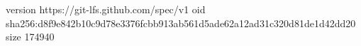 version https://git-lfs.github.com/spec/v1
oid sha256:d8f9e842b10c9d78e3376fcbb913ab561d5ade62a12ad31c320d81de1d42dd20
size 174940
